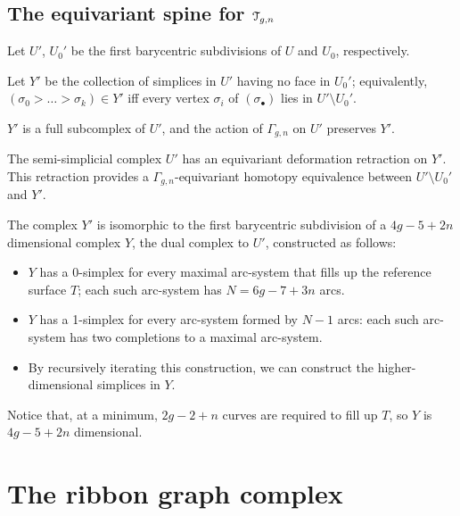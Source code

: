 \subsection{The equivariant spine for $\mathcal{T}_{g,n}$}
\label{sec:spine}

Let $U'$, $U_0'$ be the first barycentric subdivisions of $U$
and $U_0$, respectively.
\begin{definition}
  Let $Y'$ be the collection of simplices in $U'$ having no face in
  $U_0'$; equivalently, $(\sigma_0 > \ldots > \sigma_k) \in Y'$ iff every vertex $\sigma_i$
  of $(\sigma_\bullet)$ lies in $U' \setminus U_0'$.
\end{definition}
$Y'$ is a full subcomplex of $U'$, and the action of $\Gamma_{g,n}$ on $U'$
preserves $Y'$.
\begin{theorem}
  \label{thm:spine}
  The semi-simplicial complex $U'$ has an equivariant deformation
  retraction on $Y'$.  This retraction provides a
  $\Gamma_{g,n}$-equivariant homotopy equivalence between $U' \setminus U_0'$ and
  $Y'$.
\end{theorem}

The complex $Y'$ is isomorphic to the first barycentric subdivision of
a $4g - 5 + 2n$ dimensional complex $Y$, the dual complex to $U'$,
constructed as follows:
\begin{itemize}
\item $Y$ has a 0-simplex for every maximal arc-system that fills up the
  reference surface $T$; each such arc-system has $N = 6g - 7 + 3n$ arcs.
\item $Y$ has a 1-simplex for every arc-system formed by $N-1$ arcs:
  each such arc-system has two completions to a maximal arc-system.
\item By recursively iterating this construction, we can construct the
  higher-dimensional simplices in $Y$.
\end{itemize}
Notice that, at a minimum, $2g - 2 +n$ curves are required to fill up
$T$, so $Y$ is $4g - 5 + 2n$ dimensional.



\section{The ribbon graph complex}
\label{sec:ribbon-graph-complex}

